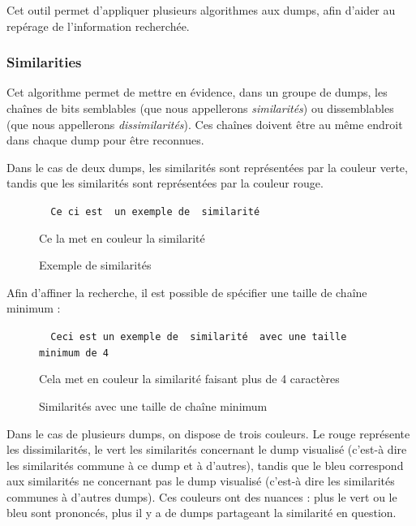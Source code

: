 Cet outil permet d'appliquer plusieurs algorithmes aux dumps, afin d'aider au repérage de l'information recherchée.

\subsubsection{Similarities \cite {ref-vandeursen}} \label{04-similarities}

Cet algorithme permet de mettre en évidence, dans un groupe de dumps, les chaînes de bits semblables (que nous appellerons \emph{similarités}) ou dissemblables (que nous appellerons \emph{dissimilarités}). Ces chaînes doivent être au même endroit dans chaque dump pour être reconnues.

Dans le cas de deux dumps, les similarités sont représentées par la couleur verte, tandis que les similarités sont représentées par la couleur rouge.

\begin{figure}[!h]
  \begin{center}
  {\tt\center
  {\color{simColor} Ce}{\color{dissimColor} ci es}{\color{simColor}t }{\color{dissimColor} un exemple de }{\color{simColor} similarité}

  {\color{simColor} Ce}{\color{dissimColor} la me}{\color{simColor}t }{\color{dissimColor} en couleur la }{\color{simColor} similarité}
  }
  \end{center}
  \caption{Exemple de similarités}
  \label{04-1-sim_simple}
\end{figure}

Afin d'affiner la recherche, il est possible de spécifier une taille de chaîne minimum :

\begin{figure}[!h]
  \begin{center}
  {\tt
  {\color{dissimColor} Ceci est un exemple de }{\color{simColor} similarité }{\color{dissimColor} avec une taille minimum de 4}

  {\color{dissimColor} Cela met en couleur la }{\color{simColor} similarité }{\color{dissimColor} faisant plus de 4 caractères}
  }
  \end{center}
  \caption{Similarités avec une taille de chaîne minimum}
  \label{04-1-sim_taille_min}
\end{figure}


Dans le cas de plusieurs dumps, on dispose de trois couleurs. Le rouge représente les dissimilarités, le vert les similarités concernant le dump visualisé (c'est-à dire les similarités commune à ce dump et à d'autres), tandis que le bleu correspond aux similarités ne concernant pas le dump visualisé (c'est-à dire les similarités communes à d'autres dumps).
Ces couleurs ont des nuances : plus le vert ou le bleu sont prononcés, plus il y a de dumps partageant la similarité en question.


